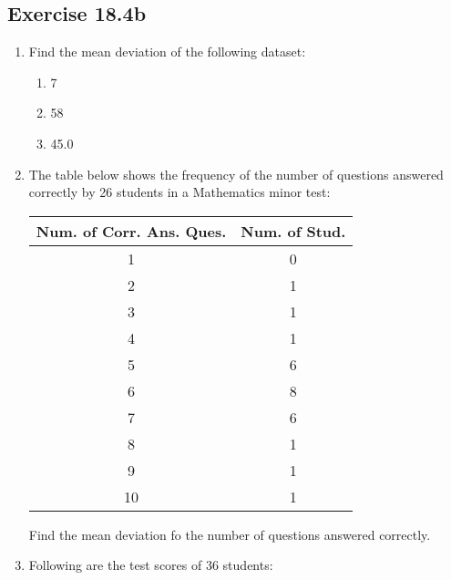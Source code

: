 \documentclass{report}
\begin{document}
\begin{multicols}{2}
  \subsection{Exercise 18.4b}

  \begin{enumerate}
    \item Find the mean deviation of the following dataset:
          \begin{enumerate}
            \item 7      
            \item 58    
            \item 45.0       
          \end{enumerate}
    \item The table below shows the frequency of the number of questions answered
          correctly by 26 students in a Mathematics minor test:
          \begin{center}
            \begin{tabular}{|c|c|}
              \hline
              Num. of Corr. Ans. Ques. & Num. of Stud. \\
              \hline
              1                        & 0             \\
              2                        & 1             \\
              3                        & 1             \\
              4                        & 1             \\
              5                        & 6             \\
              6                        & 8             \\
              7                        & 6             \\
              8                        & 1             \\
              9                        & 1             \\
              10                       & 1             \\
              \hline
            \end{tabular}
          \end{center}
          Find the mean deviation fo the number of questions answered correctly.
    \item Following are the test scores of 36 students:

\end{enumerate}
\end{multicols}
\end{document}
